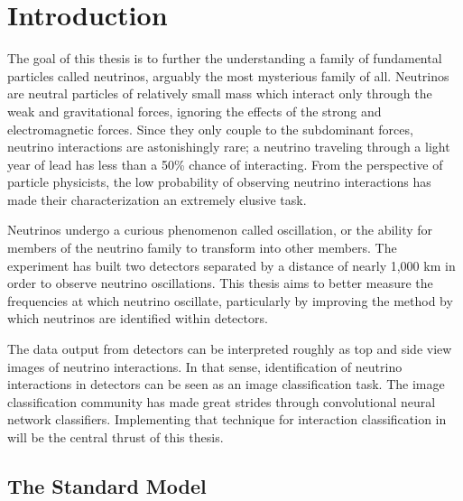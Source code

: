 \chapter{Introduction}
\label{intro_chapter}


The goal of this thesis is to further the understanding a family of fundamental particles called neutrinos, arguably the most mysterious family of all.  Neutrinos are neutral particles of relatively small mass which interact only through the weak and gravitational forces, ignoring the effects of the strong and electromagnetic forces.  Since they only couple to the subdominant forces, neutrino interactions are astonishingly rare; a neutrino traveling through a light year of lead has less than a 50\% chance of interacting.  From the perspective of particle physicists, the low probability of observing neutrino interactions has made their characterization an extremely elusive task.

Neutrinos undergo a curious phenomenon called oscillation, or the ability for members of the neutrino family to transform into other members.  The \nova experiment has built two detectors separated by a distance of nearly 1,000 km in order to observe neutrino oscillations.  This thesis aims to better measure the frequencies at which neutrino oscillate, particularly by improving the method by which neutrinos are identified within \nova detectors.

The data output from \nova detectors can be interpreted roughly as top and side view images of neutrino interactions.  In that sense, identification of neutrino interactions in \nova detectors can be seen as an image classification task.  The image classification community has made great strides through convolutional neural network classifiers.  Implementing that technique for interaction classification in \nova will be the central thrust of this thesis.


\section{The Standard Model}


